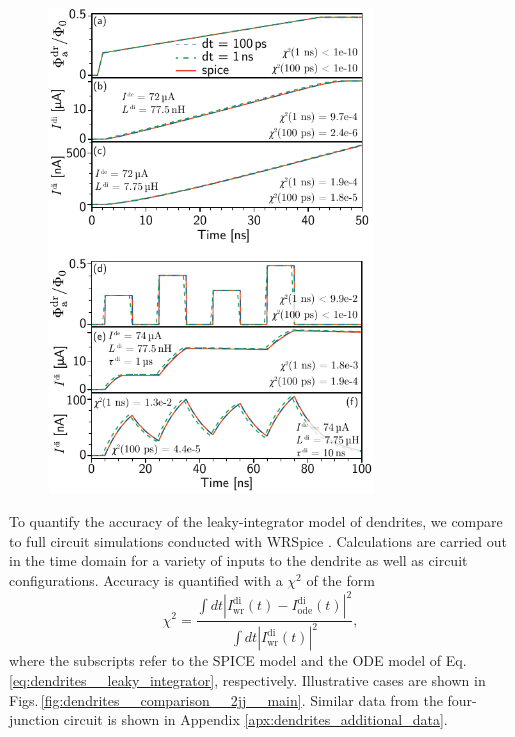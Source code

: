\documentclass[twocolumn]{article}
\begin{document}
\begin{figure}[h!]
\includegraphics[width=8.6cm]{figures/_fig__dendrites__comparison__2jj__main.pdf}
\end{figure}
To quantify the accuracy of the leaky-integrator model of dendrites, we compare to full circuit simulations conducted with WRSpice \cite{wh1991}. Calculations are carried out in the time domain for a variety of inputs to the dendrite as well as circuit configurations. Accuracy is quantified with a $\chi^2$ of the form
\begin{equation}
\label{eq:chi_squared}
\chi^2 = \frac{\int dt \left|I^{\mathrm{di}}_{\mathrm{wr}}(t) - I^{\mathrm{di}}_{\mathrm{ode}}(t)\right|^2}{\int dt \left|I^{\mathrm{di}}_{\mathrm{wr}}(t)\right|^2},
\end{equation}
where the subscripts refer to the SPICE model and the ODE model of Eq.\,\ref{eq:dendrites__leaky_integrator}, respectively. Illustrative cases are shown in Figs.\,\ref{fig:dendrites__comparison__2jj__main}. Similar data from the four-junction circuit is shown in Appendix \ref{apx:dendrites_additional_data}. %




\end{document}
